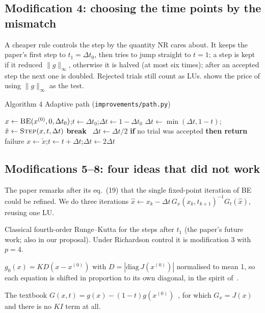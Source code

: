 \documentclass[11pt,a4paper]{article}
\newcommand{\ninf}[1]{\lVert #1\rVert_\infty}
\newcommand{\xo}{x^{(0)}}
\begin{document}
\subsection{Modification 4: choosing the time points by the mismatch}
A cheaper rule controls the step by the quantity NR cares about. It keeps the paper's first step to
$t_1=\Delta t_0$, then tries to jump straight to $t=1$; a step is kept if it reduced $\ninf{g}$, otherwise
it is halved (at most six times); after an accepted step the next one is doubled. Rejected trials still
count as LUs.  shows the price of using $\ninf{g}$ as the test.

\begin{algo}{Algorithm 4 \quad Adaptive path (\texttt{improvements/path.py})}
\begin{algorithmic}[1]
\State $x\gets\textsc{BE}(\xo,0,\Delta t_0)$;\quad $t\gets\Delta t_0$;\quad $\Delta t\gets 1-\Delta t_0$
    \State $\Delta t\gets\min(\Delta t,1-t)$;\quad $\tilde x\gets\textsc{Step}(x,t,\Delta t)$ 
    \If{$\ninf{g(\tilde x)}<\ninf{g(x)}$} \textbf{break} \Else\ $\Delta t\gets\Delta t/2$ \EndIf
  \EndFor
  \State \textbf{if} no trial was accepted \textbf{then return} failure
  \State $x\gets\tilde x$;\quad $t\gets t+\Delta t$;\quad $\Delta t\gets 2\Delta t$
\EndWhile
\end{algorithmic}
\end{algo}

\subsection{Modifications 5--8: four ideas that did not work}
\begin{description}[font=\sffamily\bfseries\color{navy},leftmargin=0pt,itemsep=3pt]
  \item[5. BE-chord.] The paper remarks after its eq.~(19) that the single fixed-point iteration of BE
        could be refined. We do three iterations $\hat x\gets x_k-\Delta t\,G_x(x_k,t_{k+1})^{-1}G_t(\hat x)$,
        reusing one LU.
  \item[6. RK4 with fixed steps.] Classical fourth-order Runge--Kutta for the steps after $t_1$ (the
        paper's future work; also in our proposal). Under Richardson control it is modification 3 with
        $p=4$.
  \item[7. Scaled homotopy.] $g_0(x)=K D(x-\xo)$ with $D=|\mathrm{diag}\,J(\xo)|$ normalised to mean 1, so each
        equation is shifted in proportion to its own diagonal, in the spirit of~\cite{freitas2023}.
  \item[8. Newton homotopy.] The textbook $G(x,t)=g(x)-(1-t)g(\xo)$~\cite{watson1989}, for which
        $G_x=J(x)$ and there is no $KI$ term at all.
\end{description}
\end{document}
